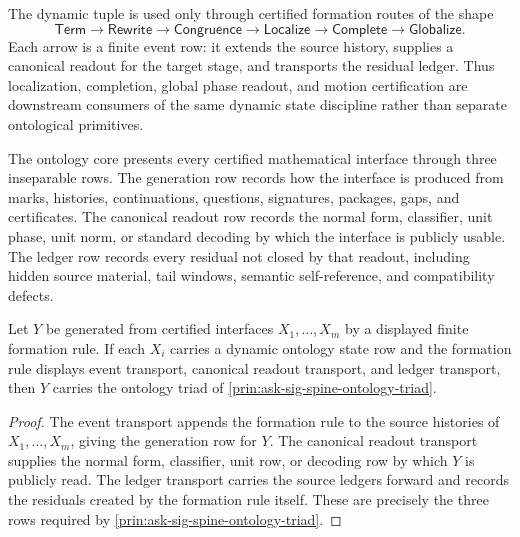 \begin{principle}
\label{prin:ask-sig-spine-dynamic-construction-route}
The dynamic tuple is used only through certified formation routes of the
shape
$$
\mathsf{Term}
\to
\mathsf{Rewrite}
\to
\mathsf{Congruence}
\to
\mathsf{Localize}
\to
\mathsf{Complete}
\to
\mathsf{Globalize}.
$$
Each arrow is a finite event row: it extends the source history, supplies a
canonical readout for the target stage, and transports the residual ledger.
Thus localization, completion, global phase readout, and motion certification
are downstream consumers of the same dynamic state discipline rather than
separate ontological primitives.
\end{principle}

\begin{principle}
\label{prin:ask-sig-spine-ontology-triad}
The ontology core presents every certified mathematical interface through
three inseparable rows.  The generation row records how the interface is
produced from marks, histories, continuations, questions, signatures,
packages, gaps, and certificates.  The canonical readout row records the
normal form, classifier, unit phase, unit norm, or standard decoding by which
the interface is publicly usable.  The ledger row records every residual not
closed by that readout, including hidden source material, tail windows,
semantic self-reference, and compatibility defects.
\end{principle}

\begin{theorem}
\label{thm:ask-sig-spine-certified-formation-inherits-ontology-triad}
Let $Y$ be generated from certified interfaces
$X_1,\ldots,X_m$ by a displayed finite formation rule.  If each $X_i$
carries a dynamic ontology state row and the formation rule displays event
transport, canonical readout transport, and ledger transport, then $Y$
carries the ontology triad of
\autoref{prin:ask-sig-spine-ontology-triad}.
\end{theorem}

\begin{proof}
The event transport appends the formation rule to the source histories of
$X_1,\ldots,X_m$, giving the generation row for $Y$.  The canonical readout
transport supplies the normal form, classifier, unit row, or decoding row by
which $Y$ is publicly read.  The ledger transport carries the source ledgers
forward and records the residuals created by the formation rule itself.
These are precisely the three rows required by
\autoref{prin:ask-sig-spine-ontology-triad}.
\end{proof}

